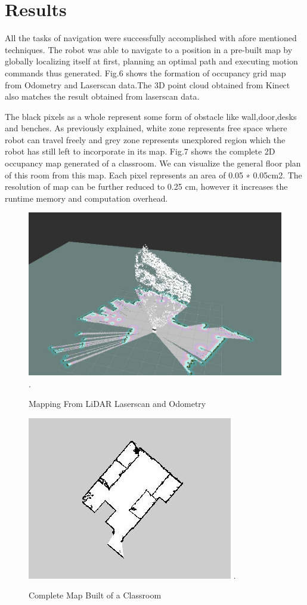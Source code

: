 \documentclass[journal,twoside]{IEEEtran}
\begin{document}
\section{Results}
\noindent All the tasks of navigation were successfully accomplished with afore mentioned techniques. The robot was able to navigate to a position in a pre-built map by globally localizing itself at first, planning an optimal path and executing motion commands thus generated. Fig.6 shows the formation of occupancy grid map from Odometry and Laserscan data.The 3D point cloud obtained from Kinect also matches the result obtained from laserscan data.
\par\noindent The black pixels as a whole represent some form of obstacle like wall,door,desks and benches. As previously explained, white zone represents free space where robot can travel freely and grey zone represents unexplored region which the robot has still left to incorporate in its map. Fig.7 shows the complete 2D occupancy map generated of a classroom. We can visualize the general floor plan of this room from this map. Each pixel represents an area of 0.05 ∗ 0.05cm2. The resolution of map can be further reduced to 0.25 cm, however it increases the runtime memory and computation overhead.
\begin{figure}[h!]
\centering
\includegraphics[scale=.27]{6.jpg}
\DeclareGraphicsExtensions.
\caption{Mapping From LiDAR Laserscan and Odometry}
\end{figure}
\begin{figure}[h!]
\centering
\includegraphics[scale=.73]{7.jpg}
\DeclareGraphicsExtensions.
\caption{Complete Map Built of a Classroom}
\end{figure}
\end{document}
